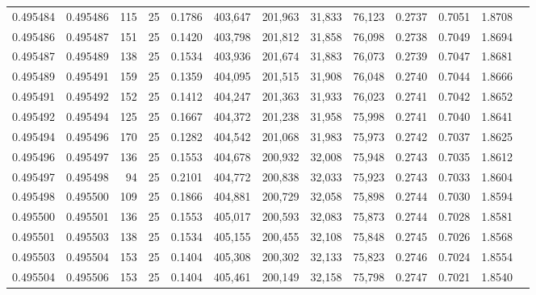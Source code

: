 \begin{tabular}{rrrrrrrrrrrrr}
0.495484 & 0.495486 &   115 &  25 &                                     0.1786 & 403,647 & 201,963 &  31,833 &  76,123 & 0.2737 & 0.7051 & 1.8708 \\
0.495486 & 0.495487 &   151 &  25 &                                     0.1420 & 403,798 & 201,812 &  31,858 &  76,098 & 0.2738 & 0.7049 & 1.8694 \\
0.495487 & 0.495489 &   138 &  25 &                                     0.1534 & 403,936 & 201,674 &  31,883 &  76,073 & 0.2739 & 0.7047 & 1.8681 \\
0.495489 & 0.495491 &   159 &  25 &                                     0.1359 & 404,095 & 201,515 &  31,908 &  76,048 & 0.2740 & 0.7044 & 1.8666 \\
0.495491 & 0.495492 &   152 &  25 &                                     0.1412 & 404,247 & 201,363 &  31,933 &  76,023 & 0.2741 & 0.7042 & 1.8652 \\
0.495492 & 0.495494 &   125 &  25 &                                     0.1667 & 404,372 & 201,238 &  31,958 &  75,998 & 0.2741 & 0.7040 & 1.8641 \\
0.495494 & 0.495496 &   170 &  25 &                                     0.1282 & 404,542 & 201,068 &  31,983 &  75,973 & 0.2742 & 0.7037 & 1.8625 \\
0.495496 & 0.495497 &   136 &  25 &                                     0.1553 & 404,678 & 200,932 &  32,008 &  75,948 & 0.2743 & 0.7035 & 1.8612 \\
0.495497 & 0.495498 &    94 &  25 &                                     0.2101 & 404,772 & 200,838 &  32,033 &  75,923 & 0.2743 & 0.7033 & 1.8604 \\
0.495498 & 0.495500 &   109 &  25 &                                     0.1866 & 404,881 & 200,729 &  32,058 &  75,898 & 0.2744 & 0.7030 & 1.8594 \\
0.495500 & 0.495501 &   136 &  25 &                                     0.1553 & 405,017 & 200,593 &  32,083 &  75,873 & 0.2744 & 0.7028 & 1.8581 \\
0.495501 & 0.495503 &   138 &  25 &                                     0.1534 & 405,155 & 200,455 &  32,108 &  75,848 & 0.2745 & 0.7026 & 1.8568 \\
0.495503 & 0.495504 &   153 &  25 &                                     0.1404 & 405,308 & 200,302 &  32,133 &  75,823 & 0.2746 & 0.7024 & 1.8554 \\
0.495504 & 0.495506 &   153 &  25 &                                     0.1404 & 405,461 & 200,149 &  32,158 &  75,798 & 0.2747 & 0.7021 & 1.8540 \\

\end{tabular}
